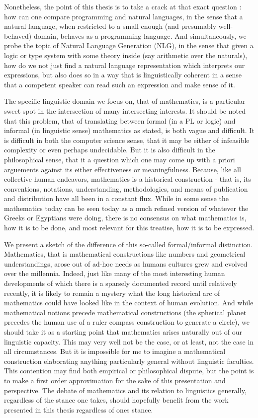 Nonetheless, the point of this thesis is to take a crack at that exact question
: how can one compare programming and natural languages, in the sense that a
natural language, when restricted to a small enough (and presumably
well-behaved) domain, behaves as a programming language. And simultaneously, we
probe the topic of Natural Language Generation (NLG), in the sense that given a
logic or type system with some theory inside (say arithmetic over the naturals),
how do we not just find a natural language representation which interprets our
expressions, but also does so in a way that is linguistically coherent in a
sense that a competent speaker can read such an expression and make sense of it.

The specific linguistic domain we focus on, that of mathematics, is a particular
sweet spot in the intersection of many intersecting interests. It should be
noted that this problem, that of translating between formal (in a PL or logic)
and informal (in linguistic sense) mathematics as stated, is both vague and
difficult. It is difficult in both the computer science sense, that it may be
either of infeasible complexity or even perhaps undecidable. But it is also
difficult in the philosophical sense, that it a question which one may come up
with a priori arguements against its either effectiveness or meaningfulness.
Because, like all collective human endeavors, mathematics is a historical
construction - that is, its conventions, notations, understanding,
methodologies, and means of publication and distribution have all been in a
constant flux. While in some sense the mathematics today can be seen today as a
much refined version of whatever the Greeks or Egyptians were doing, there is no
consensus on what mathematics is, how it is to be done, and most relevant for
this treatise, how it is to be expressed.

We present a sketch of the difference of this so-called formal/informal
distinction. Mathematics, that is mathematical constructions like numbers and
geometrical understandings, arose out of ad-hoc needs as humans cultures grew
and evolved over the millennia. Indeed, just like many of the most interesting
human developments of which there is a sparsely documented record until
relatively recently, it is likely to remain a mystery what the long historical
arc of mathematics could have looked like in the context of human evolution. And
while mathematical notions precede mathematical constructions (the spherical
planet precedes the human use of a ruler compass construction to generate a
circle), we should take it as a starting point that mathematics arises naturally
out of our linguistic capacity. This may very well not be the case, or at least,
not the case in all circumstances. But it is impossible for me to imagine a
mathematical construction elaborating anything particularly general without
linguistic faculties. This contention may find both empirical or philosophical
dispute, but the point is to make a first order approximation for the sake of
this presentation and perspective. The debate of mathematics and its relation to
linguistics generally, regardless of the stance one takes, should hopefully
benefit from the work presented in this thesis regardless of ones stance.

